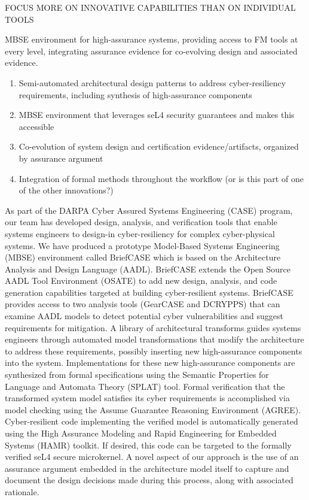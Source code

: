 FOCUS MORE ON INNOVATIVE CAPABILITIES THAN ON INDIVIDUAL TOOLS

MBSE environment for high-assurance systems, providing access to FM tools at every level, integrating assurance evidence for co-evolving design and associated evidence.

\begin{enumerate}
\item Semi-automated architectural design patterns to address cyber-resiliency requirements, including synthesis of high-assurance components
\item MBSE environment that leverages seL4 security guarantees and makes this accessible
\item Co-evolution of system design and certification evidence/artifacts, organized by assurance argument
\item Integration of formal methods throughout the workflow (or is this part of one of the other innovations?)
\end{enumerate}

As part of the DARPA Cyber Assured Systems Engineering (CASE) program,
our team has developed design, analysis, and verification
tools that enable systems engineers to design-in cyber-resiliency
for complex cyber-physical systems. We have produced a prototype
Model-Based Systems Engineering (MBSE) environment called
BriefCASE which is based on the Architecture Analysis and Design
Language (AADL). BriefCASE extends the Open Source AADL
Tool Environment (OSATE) to add new design, analysis, and code
generation capabilities targeted at building cyber-resilient systems.
BriefCASE provides access to two analysis tools (GearCASE
and DCRYPPS) that can examine AADL models to detect potential
cyber vulnerabilities and suggest requirements for mitigation.
A library of architectural transforms guides systems engineers
through automated model transformations that modify the
architecture to address these requirements, possibly inserting new
high-assurance components into the system. Implementations for
these new high-assurance components are synthesized from formal
specifications using the Semantic Properties for Language and
Automata Theory (SPLAT) tool. Formal verification that the
transformed system model satisfies its cyber requirements is accomplished
via model checking using the Assume Guarantee Reasoning
Environment (AGREE). Cyber-resilient code implementing the
verified model is automatically generated using the High Assurance
Modeling and Rapid Engineering for Embedded Systems (HAMR)
toolkit. If desired, this code can be targeted to the formally
verified seL4 secure microkernel.
A novel aspect of our approach is the use of an assurance argument
embedded in the architecture model itself to capture and
document the design decisions made during this process, along
with associated rationale.
